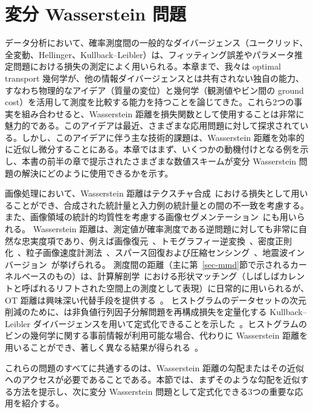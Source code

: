 \chapter{変分 Wasserstein 問題}
\label{c-variational}

データ分析において、確率測度間の一般的なダイバージェンス（\eg ユークリッド、全変動、Hellinger、Kullback--Leibler）は、フィッティング誤差やパラメータ推定問題における損失の測定によく用いられる。本章まで、我々は optimal transport 幾何学が、他の情報ダイバージェンスとは共有されない独自の能力、すなわち物理的なアイデア（質量の変位）と幾何学（観測値やビン間の ground cost）を活用して測度を比較する能力を持つことを論じてきた。これら2つの事実を組み合わせると、Wasserstein 距離を損失関数として使用することは非常に魅力的である。このアイデアは最近、さまざまな応用問題に対して探求されている。しかし、このアイデアに伴う主な技術的課題は、Wasserstein 距離を効率的に近似し微分することにある。本章ではまず、いくつかの動機付けとなる例を示し、本書の前半の章で提示されたさまざまな数値スキームが変分 Wasserstein 問題の解決にどのように使用できるかを示す。

画像処理において、Wasserstein 距離はテクスチャ合成~\citep{2016-tartavel-siims}における損失として用いることができ、合成された統計量と入力例の統計量との間の不一致を考慮する。また、画像領域の統計的均質性を考慮する画像セグメンテーション~\citep{SchnorSegmentation,RabinPapadakisSSVM,peyre2012wasserstein,ni2009local,schmitzer2013object,liimage}にも用いられる。
Wasserstein 距離は、測定値が確率測度である逆問題に対しても非常に自然な忠実度項であり、例えば画像復元~\citep{lellmann2014imaging}、トモグラフィー逆変換~\citep{AbrahamRadon}、密度正則化~\citep{Burger-JKO}、粒子画像速度計測法~\citep{saumier2015optimal}、スパース回復および圧縮センシング~\citep{indyk2011k}、地震波インバージョン~\citep{metivier2016optimal}が挙げられる。
測度間の距離（主に第~\ref{sec-mmd}節で示されるカーネルベースのもの）は、計算解剖学~\citep{vaillant2005surface}における形状マッチング（しばしばカレントと呼ばれるリフトされた空間上の測度として表現）に日常的に用いられるが、OT 距離は興味深い代替手段を提供する~\citep{2017-feydy-miccai}。
ヒストグラムのデータセットの次元削減のために、\citeauthor{lee1999learning}は非負値行列因子分解問題を再構成損失を定量化する Kullback--Leibler ダイバージェンスを用いて定式化できることを示した~\citep{lee1999learning}。ヒストグラムのビンの幾何学に関する事前情報が利用可能な場合、代わりに Wasserstein 距離を用いることができ、著しく異なる結果が得られる~\citep{Sandler09,ZenICPR14,pmlr-v51-rolet16}。

これらの問題のすべてに共通するのは、Wasserstein 距離の勾配またはその近似へのアクセスが必要であることである。本節では、まずそのような勾配を近似する方法を提示し、次に変分 Wasserstein 問題として定式化できる3つの重要な応用を紹介する。

